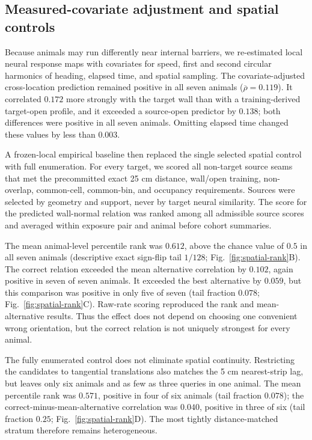 \documentclass[10pt,twocolumn]{article}
\newcommand{\meanrho}{\overline{\rho}}
\begin{document}
\subsection{Measured-covariate adjustment and spatial controls}

Because animals may run differently near internal barriers, we re-estimated
local neural response maps with covariates for speed, first and second circular
harmonics of heading, elapsed time, and spatial sampling. The covariate-adjusted
cross-location prediction remained positive in all seven animals
(\(\meanrho=0.119\)). It correlated \(0.172\) more strongly with the target wall
than with a training-derived target-open profile, and it exceeded a source-open
predictor by \(0.138\); both differences were positive in all seven animals.
Omitting elapsed time changed these values by less than \(0.003\).

A frozen-local empirical baseline then replaced the single selected spatial
control with full enumeration. For every target, we scored all non-target
source seams that met the precommitted exact 25 cm distance, wall/open training,
non-overlap, common-cell, common-bin, and occupancy requirements. Sources were
selected by geometry and support, never by target neural similarity. The score
for the predicted wall-normal relation was ranked among all admissible source
scores and averaged within exposure pair and animal before cohort summaries.

The mean animal-level percentile rank was \(0.612\), above the chance value of
\(0.5\) in all seven animals (descriptive exact sign-flip tail \(1/128\);
Fig.~\ref{fig:spatial-rank}B). The correct relation exceeded the mean
alternative correlation by \(0.102\), again positive in seven of seven animals.
It exceeded the best alternative by \(0.059\), but this comparison was positive
in only five of seven (tail fraction \(0.078\); Fig.~\ref{fig:spatial-rank}C).
Raw-rate scoring reproduced the rank and mean-alternative results. Thus the
effect does not depend on choosing one convenient wrong orientation, but the
correct relation is not uniquely strongest for every animal.

The fully enumerated control does not eliminate spatial continuity. Restricting
the candidates to tangential translations also matches the 5 cm nearest-strip
lag, but leaves only six animals and as few as three queries in one animal. The
mean percentile rank was \(0.571\), positive in four of six animals (tail
fraction \(0.078\)); the correct-minus-mean-alternative correlation was
\(0.040\), positive in three of six (tail fraction \(0.25\);
Fig.~\ref{fig:spatial-rank}D). The most tightly distance-matched stratum
therefore remains heterogeneous.
\end{document}
